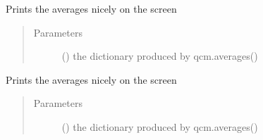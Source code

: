 \documentclass[letterpaper,10pt,english]{sphinxmanual}
\begin{document}

\begin{fulllineitems}
\label{\detokenize{functions:pyqcm.print_averages}}
\sphinxAtStartPar
Prints the averages nicely on the screen
\begin{quote}\begin{description}
\item[{Parameters}] \leavevmode
\sphinxAtStartPar
{} () \textendash{} the dictionary produced by qcm.averages()

\end{description}\end{quote}

\end{fulllineitems}


\begin{fulllineitems}
\label{\detokenize{functions:pyqcm.print_cluster_averages}}
\sphinxAtStartPar
Prints the averages nicely on the screen
\begin{quote}\begin{description}
\item[{Parameters}] \leavevmode
\sphinxAtStartPar
{} () \textendash{} the dictionary produced by qcm.averages()

\end{description}\end{quote}

\end{fulllineitems}

\end{document}
